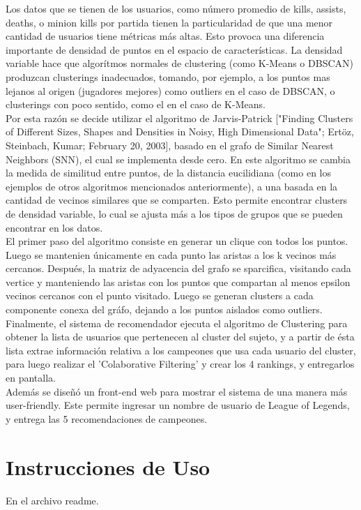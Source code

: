 \documentclass[letterpaper,11pt, spanish]{article}
\begin{document}
Los datos que se tienen de los usuarios, como número promedio de kills, assists, deaths, o minion kills por partida tienen la particularidad de que una menor cantidad de usuarios tiene métricas más altas. Esto provoca una diferencia importante de densidad de puntos en el espacio de características. La densidad variable hace que algorítmos normales de clustering (como K-Means o DBSCAN) produzcan clusterings inadecuados, tomando, por ejemplo, a los puntos mas lejanos al origen (jugadores mejores) como outliers en el caso de DBSCAN, o clusterings con poco sentido, como el en el caso de K-Means. \\

Por esta razón se decide utilizar el algoritmo de Jarvis-Patrick ["Finding Clusters of Different Sizes, Shapes and Densities in Noisy, High Dimensional Data"; Ertöz, Steinbach, Kumar; February 20, 2003], basado en el grafo de Similar Nearest Neighbors (SNN), el cual se implementa desde cero. En este algoritmo se cambia la medida de similitud entre puntos, de la distancia eucilidiana (como en los ejemplos de otros algoritmos mencionados anteriormente), a una basada en la cantidad de vecinos similares que se comparten. Esto permite encontrar clusters de densidad variable, lo cual se ajusta más a los tipos de grupos que se pueden encontrar en los datos. \\

El primer paso del algoritmo consiste en generar un clique con todos los puntos. Luego se mantenien únicamente en cada punto las aristas a los k vecinos más cercanos. Después, la matriz de adyacencia del grafo se sparcifica, visitando cada vertice y manteniendo las aristas con los puntos que compartan al menos epsilon vecinos cercanos con el punto visitado. Luego se generan clusters a cada componente conexa del gráfo, dejando a los puntos aislados como outliers. \\

Finalmente, el sistema de recomendador ejecuta el algoritmo de Clustering para obtener la lista de usuarios que pertenecen al cluster del sujeto, y a partir de ésta lista extrae información relativa a los campeones que usa cada usuario del cluster, para luego realizar el 'Colaborative Filtering' y crear los 4 rankings, y entregarlos en pantalla.\\

Además se diseñó un front-end web para mostrar el sistema de una manera más user-friendly. Este permite ingresar un nombre de usuario de League of Legends, y entrega las 5 recomendaciones de campeones.

\section{Instrucciones de Uso}

En el archivo readme.

\end{document}
